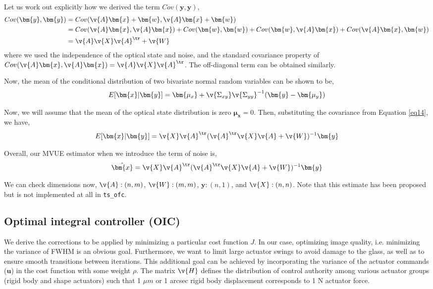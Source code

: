 \documentclass[SE,authoryear,toc]{lsstdoc}
\begin{document}
Let us work out explicitly how we derived the term $Cov(\bm{y}, \bm{y})$,
\begin{equation}\label{eq14}
\begin{split}
    Cov(\bm{y}, \bm{y}) & = Cov(\v{A}\bm{x} + \bm{w}, \v{A}\bm{x} + \bm{w}) \\ 
    & = Cov(\v{A}\bm{x}, \v{A}\bm{x}) + Cov(\bm{w}, \bm{w}) + Cov(\bm{w}, \v{A}\bm{x}) + Cov(\v{A}\bm{x}, \bm{w}) \\ 
    &= \v{A}\v{X}\v{A}^{\tr} + \v{W}
\end{split}
\end{equation}
where we used the independence of the optical state and noise, and the standard covariance property of $Cov(\v{A}\bm{x}, \v{A}\bm{x}) = \v{A}\v{X}\v{A}^{\tr}$. The off-diagonal term can be obtained similarly. 

Now, the mean of the conditional distribution of two bivariate normal random variables can be shown to be, 
\begin{equation}
    E[\bm{x} | \bm{y}] = \bm{\mu_x} + \v{\Sigma_{xy} } \v{\Sigma_{yy}}^{-1} (\bm{y} - \bm{\mu_y})
\end{equation}

Now, we will assume that the mean of the optical state distribution is zero $\bm{\mu_x} = 0$. Then, substituting the covariance from Equation \ref{eq14}, we have, 
\begin{equation}
    E[\bm{x} | \bm{y}] = \v{X}\v{A}^{\tr}(\v{A}^{\tr}\v{X}\v{A} + \v{W})^{-1} \bm{y}
\end{equation}

Overall, our MVUE estimator when we introduce the term of noise is, 
\begin{equation}
    \hat{\bm{x}} = \v{X}\v{A}^{\tr}(\v{A}^{\tr}\v{X}\v{A} + \v{W})^{-1} \bm{y}
\end{equation}

We can check dimensions now, $\v{A}: (n, m)$, $\v{W}: (m, m)$, $\bm{y}: (n, 1)$, and $\v{X}: (n, n)$. Note that this estimate has been proposed but is not implemented at all in \texttt{ts\_ofc}.



\subsection*{Optimal integral controller (OIC)}
We derive the corrections to be applied by minimizing a particular cost function $J$. In our case, optimizing image quality, i.e. minimizing the variance of FWHM is an obvious goal. Furthermore, we want to limit large actuator swings to avoid damage to the glass, as well as to ensure smooth transitions between iterations. This additional goal can be achieved by incorporating the variance of the actuator commands ($\bm{u}$) in the cost function with some weight $\rho$. The matrix $\v{H}$ defines the distribution of control authority among various actuator groups (rigid body and shape actuators) such that 1 $\mu m$ or 1 arcsec rigid body displacement corresponds to 1 N actuator force. 
\end{document}

